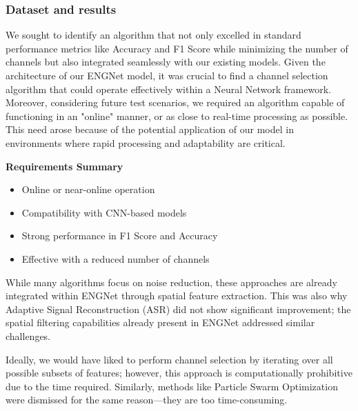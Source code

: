 \documentclass{Configuration_Files/PoliMi3i_thesis}
\begin{document}

\subsubsection{Dataset and results}


We sought to identify an algorithm that not only excelled in standard performance metrics like Accuracy and F1 Score while minimizing the number of channels but also integrated seamlessly with our existing models. Given the architecture of our ENGNet model, it was crucial to find a channel selection algorithm that could operate effectively within a Neural Network framework.
Moreover, considering future test scenarios, we required an algorithm capable of functioning in an "online" manner, or as close to real-time processing as possible. This need arose because of the potential application of our model in environments where rapid processing and adaptability are critical.

\textbf{Requirements Summary}
\begin{itemize}
    \item Online or near-online operation
    \item Compatibility with CNN-based models
    \item Strong performance in F1 Score and Accuracy
    \item Effective with a reduced number of channels
\end{itemize}

While many algorithms focus on noise reduction, these approaches are already integrated within ENGNet through spatial feature extraction. This was also why Adaptive Signal Reconstruction (ASR) did not show significant improvement; the spatial filtering capabilities already present in ENGNet addressed similar challenges.


Ideally, we would have liked to perform channel selection by iterating over all possible subsets of features; however, this approach is computationally prohibitive due to the time required. Similarly, methods like Particle Swarm Optimization were dismissed for the same reason—they are too time-consuming.
\end{document}
